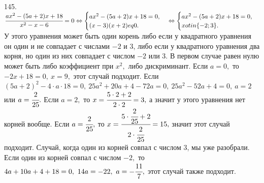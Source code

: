 145. $\cfrac{ax^2-(5a+2)x+18}{x^2-x-6}=0\Leftrightarrow \begin{cases}
ax^2-(5a+2)x+18=0,\\ (x-3)(x+2)
eq0.\end{cases}\Leftrightarrow \begin{cases}
ax^2-(5a+2)x+18=0,\\ x
otin\{-2;3\}.\end{cases}$ У этого уравнения может быть один корень либо если у квадратного уравнения он один и не совпадает с числами $-2$ и 3, либо если у квадратного уравнения два корня, но один из них совпадает с числом $-2$ или 3. В первом случае равен нулю может быть либо коэффициент при $x^2,$ либо дискриминант. Если $a=0,$ то $-2x+18=0,\ x=9,$ этот случай подходит. Если $(5a+2)^2-4\cdot a\cdot18=0,\ 25a^2+20a+4-72a=0,\
25a^2-52a+4=0,\ a=2$ или $a=\cfrac{2}{25}.$ Если $a=2,$ то $x=\cfrac{5\cdot2+2}{2\cdot2}=3,$ а значит у этого уравнения нет корней вообще. Если $a=\cfrac{2}{25},$ то $x=\cfrac{5\cdot\cfrac{2}{25}+2}{2\cdot\cfrac{2}{25}}=15,$ значит этот случай подходит. Случай, когда один из корней совпал с числом 3, мы уже разобрали. Если один из корней совпал с числом $-2,$ то $4a+10a+4+18=0,\ 14a=-22,\ a=-\cfrac{11}{7},$ этот случай также подходит.\\
